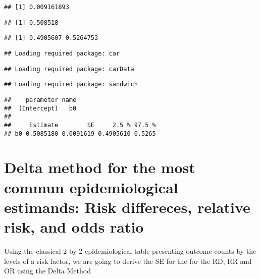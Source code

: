 \documentclass[
]{article}
\begin{document}
\begin{verbatim}
## [1] 0.009161893
\end{verbatim}

\begin{verbatim}
## [1] 0.508518
\end{verbatim}

\begin{verbatim}
## [1] 0.4905607 0.5264753
\end{verbatim}

\begin{verbatim}
## Loading required package: car
\end{verbatim}

\begin{verbatim}
## Loading required package: carData
\end{verbatim}

\begin{verbatim}
## Loading required package: sandwich
\end{verbatim}

\begin{verbatim}
##    parameter name
##  (Intercept)   b0
## 
##     Estimate        SE     2.5 % 97.5 %
## b0 0.5085180 0.0091619 0.4905610 0.5265
\end{verbatim}

\hypertarget{delta-method-for-the-most-commun-epidemiological-estimands-risk-differeces-relative-risk-and-odds-ratio}{%
\section{Delta method for the most commun epidemiological estimands:
Risk differeces, relative risk, and odds
ratio}\label{delta-method-for-the-most-commun-epidemiological-estimands-risk-differeces-relative-risk-and-odds-ratio}}

Using the classical 2 by 2 epidemiological table presenting outcome
counts by the levels of a risk factor, we are going to derive the SE for
the for the RD, RR and OR using the Delta Method
\end{document}
